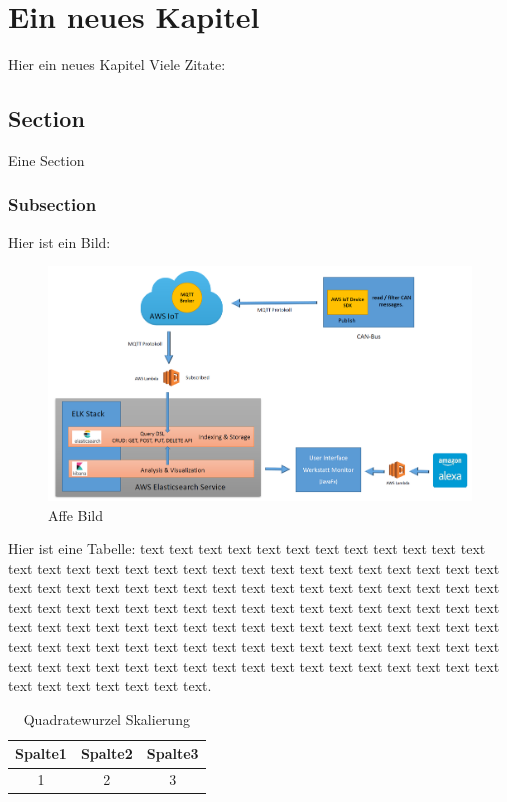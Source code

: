 \chapter{Ein neues Kapitel}
    Hier ein neues Kapitel
    Viele Zitate: \cite{patterson} \cite{krizhevsky} \cite{matlab} \cite{pitts} \cite{lawrence} \cite{miesbach}
    \section{Section}
        Eine Section
        \subsection{Subsection}
        
        
Hier ist ein Bild:        
            \begin{figure}[h]
                \includegraphics[scale=0.2]{Abbildungen/Kapitel4/Big-architecture.png}
                \centering
                \caption{Affe Bild}
                \label{Abb:Affe}   
            \end{figure}  
            
Hier ist eine Tabelle: text text text text text text text text text text text text text text text text text text text text text text text text text text text text text text text text text text text text text text text text text text text text text text text text text text text text text text text text text text text text text text text text text text text text text text text text text text text text text text text text text text text text text text text text text text text text text text text text text text text text text text text text text text text text text text text text text text text text text text text text text.           
            
             \begin{table}[h]
                \begin{tabular}{ccc}
                      \hline
                      Spalte1 & Spalte2 & Spalte3\\                      
                      \hline
                      1 & 2 & 3\\
                      \hline
                \end{tabular}
                \centering
                \caption{Quadratewurzel Skalierung}
                \label{Tab:Quadratewurzel Skalierung}
            \end{table}
            
